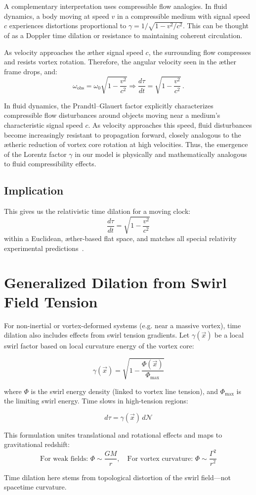 A complementary interpretation uses compressible flow analogies. In fluid dynamics, a body moving at speed $v$ in a compressible medium with signal speed $c$ experiences distortions proportional to $\gamma = 1/\sqrt{1 - v^2/c^2}$. This can be thought of as a Doppler time dilation or resistance to maintaining coherent circulation. 

As velocity approaches the æther signal speed $c$, the surrounding flow compresses and resists vortex rotation. Therefore, the angular velocity seen in the æther frame drops, and:
\begin{equation}
\omega_\text{obs} = \omega_0 \sqrt{1 - \frac{v^2}{c^2}} \Rightarrow \frac{d\tau}{dt} = \sqrt{1 - \frac{v^2}{c^2}} \,.
\end{equation}

In fluid dynamics, the Prandtl–Glauert factor explicitly characterizes compressible flow disturbances around objects moving near a medium's characteristic signal speed $c$. As velocity approaches this speed, fluid disturbances become increasingly resistant to propagation forward, closely analogous to the ætheric reduction of vortex core rotation at high velocities. Thus, the emergence of the Lorentz factor $\gamma$ in our model is physically and mathematically analogous to fluid compressibility effects.

\subsection*{Implication}

This gives us the relativistic time dilation for a moving clock:
\[
\boxed{\frac{d\tau}{dt} = \sqrt{1 - \frac{v^2}{c^2}}}
\]
within a Euclidean, æther-based flat space, and matches all special relativity experimental predictions~\cite{Rado2020-æther-Lorentz, Levy2009-æther-clock}.

\section*{Generalized Dilation from Swirl Field Tension}\label{sec:generalized_dilation}

For non-inertial or vortex-deformed systems (e.g. near a massive vortex), time dilation also includes effects from swirl tension gradients. Let $\gamma(\vec{x})$ be a local swirl factor based on local curvature energy of the vortex core:

\[
\gamma(\vec{x}) = \sqrt{1 - \frac{\Phi(\vec{x})}{\Phi_{\text{max}}}}
\]

where $\Phi$ is the swirl energy density (linked to vortex line tension), and $\Phi_{\text{max}}$ is the limiting swirl energy. Time slows in high-tension regions:

\[
d\tau = \gamma(\vec{x})\, d\mathcal{N}
\]

This formulation unites translational and rotational effects and maps to gravitational redshift:
\[
\text{For weak fields: } \Phi \sim \frac{G M}{r}, \quad \text{For vortex curvature: } \Phi \sim \frac{\Gamma^2}{r^2}
\]

Time dilation here stems from topological distortion of the swirl field—not spacetime curvature.
